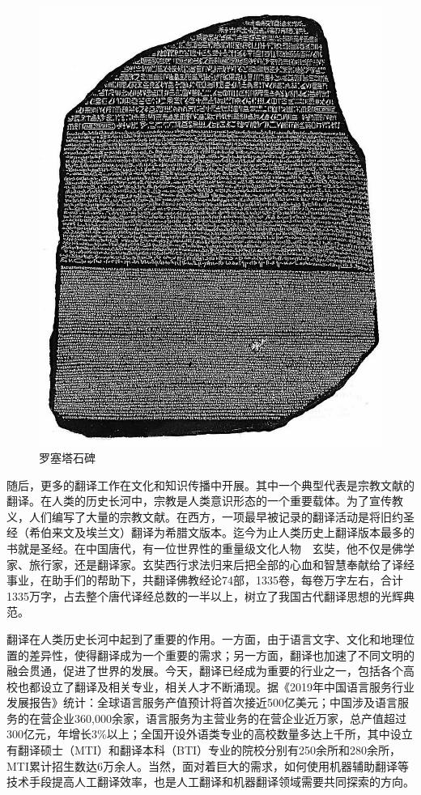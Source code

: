 \begin{figure}[htp]
    \centering
\includegraphics[scale=0.20]{./Chapter1/Figures/figure-rosetta-stone.jpg}
    \caption{罗塞塔石碑}
    \label{fig:1-3}
\end{figure}

\parinterval 随后，更多的翻译工作在文化和知识传播中开展。其中一个典型代表是宗教文献的翻译。在人类的历史长河中，宗教是人类意识形态的一个重要载体。为了宣传教义，人们编写了大量的宗教文献。在西方，一项最早被记录的翻译活动是将旧约圣经（希伯来文及埃兰文）翻译为希腊文版本。迄今为止人类历史上翻译版本最多的书就是圣经。在中国唐代，有一位世界性的重量级文化人物\ \dash \ 玄奘，他不仅是佛学家、旅行家，还是翻译家。玄奘西行求法归来后把全部的心血和智慧奉献给了译经事业，在助手们的帮助下，共翻译佛教经论74部，1335卷，每卷万字左右，合计1335万字，占去整个唐代译经总数的一半以上，树立了我国古代翻译思想的光辉典范。

\parinterval 翻译在人类历史长河中起到了重要的作用。一方面，由于语言文字、文化和地理位置的差异性，使得翻译成为一个重要的需求；另一方面，翻译也加速了不同文明的融会贯通，促进了世界的发展。今天，翻译已经成为重要的行业之一，包括各个高校也都设立了翻译及相关专业，相关人才不断涌现。据《2019年中国语言服务行业发展报告》统计：全球语言服务产值预计将首次接近500亿美元；中国涉及语言服务的在营企业360,000余家，语言服务为主营业务的在营企业近万家，总产值超过300亿元，年增长3\%以上；全国开设外语类专业的高校数量多达上千所，其中设立有翻译硕士（MTI）和翻译本科（BTI）专业的院校分别有250余所和280余所，MTI累计招生数达6万余人\cite{赵军峰2019深化改革}。当然，面对着巨大的需求，如何使用机器辅助翻译等技术手段提高人工翻译效率，也是人工翻译和机器翻译领域需要共同探索的方向。

